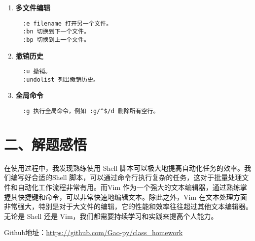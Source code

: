 \documentclass[UTF8]{ctexart}
\begin{document}
\begin{enumerate}
  \item \textbf{多文件编辑}
  \begin{verbatim}
  :e filename 打开另一个文件。
  :bn 切换到下一个文件。
  :bp 切换到上一个文件。
  \end{verbatim}

  \item \textbf{撤销历史}
  \begin{verbatim}
  :u 撤销。
  :undolist 列出撤销历史。
  \end{verbatim}

  \item \textbf{全局命令}
  \begin{verbatim}
  :g 执行全局命令，例如 :g/^$/d 删除所有空行。
  \end{verbatim}
\end{enumerate}

\section*{二、解题感悟}

在使用过程中，我发现熟练使用 Shell 脚本可以极大地提高自动化任务的效率。我们编写好合适的Shell 脚本，可以通过命令行执行复杂的任务，这对于批量处理文件和自动化工作流程非常有用。而Vim 作为一个强大的文本编辑器，通过熟练掌握其快捷键和命令，可以非常快速地编辑文本。除此之外，Vim 在文本处理方面非常强大，特别是对于大文件的编辑，它的性能和效率往往超过其他文本编辑器。无论是 Shell 还是 Vim，我们都需要持续学习和实践来提高个人能力。

Github地址：\url{https://github.com/Gao-py/class_homework}
\end{document}
